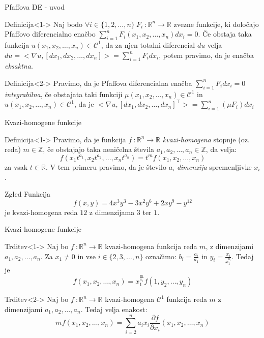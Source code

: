 \documentclass[t, 8pt]{beamer} %
\newcommand{\mth}[1]{\ensuremath{\mathbb{#1}}}
\newcommand{\R}{\mth{R}}
\newcommand{\Z}{\mth{Z}}
\newcommand{\pojem}[1]{\emph{#1}}
\newcommand{\map}[3]{\ensuremath{{#1}~: {#2} \rightarrow {#3}}}
\newcommand{\fillblack}[1]{
	\begin{tikzpicture}[remember picture, overlay]
		\node [shift={(0 cm,0cm)}]  at (current page.south west)
		{%
			\begin{tikzpicture}[remember picture, overlay] at (current page.south west)
				\draw [fill=black] (0, 0) -- (0,#1 \paperheight) --
				(\paperwidth,#1 \paperheight) -- (\paperwidth,0) -- cycle ;
			\end{tikzpicture}
		};
		\draw (current page.north west) rectangle (current page.south east);
	\end{tikzpicture}
}
\begin{document}
	\begin{frame}{Pfaffova DE - uvod}
		
		\begin{block}{Definicija}<1->
			Naj bodo $\forall i\in\{1, 2, \ldots, n\}~ \map{F_i}{\R^n}{\R}$ zvezne funkcije, ki določajo Pfaffovo diferencialno enačbo $\sum_{i = 1}^{n}F_i(x_1, x_2, \ldots, x_n)dx_i = 0$. Če obstaja taka funkcija $u(x_1, x_2, \ldots, x_n)\in \mathcal{C}^1$, da za njen totalni diferencial $du$ velja $du = <\nabla u, [dx_1, dx_2, \ldots, dx_n]> = \sum_{i = 1}^{n}F_i dx_i$, potem pravimo, da je enačba \pojem{eksaktna}.
		\end{block}
		\begin{block}{Definicija}<2->
			Pravimo, da je Pfaffova diferencialna enačba $\sum_{i = 1}^n F_i dx_i = 0$ \pojem{integrabilna}, če obstajata taki funkciji $\mu(x_1, x_2, \ldots, x_n)\in \mathcal{C}^1$ in $u(x_1, x_2, \ldots, x_n)\in \mathcal{C}^1$, da je $<\nabla u,[dx_1, dx_2, \ldots, dx_n]^\top> = \sum_{i = 1}^n (\mu F_i) dx_i$
		\end{block}
		
	\end{frame}
	
	\begin{frame}{Kvazi-homogene funkcije}
		\begin{block}{Definicija}<1->
			Pravimo, da je funkcija $\map{f}{\R^n}{\R}$ \pojem{kvazi-homogena} stopnje (oz. reda) $m\in\Z$, če obstajajo taka neničelna števila $a_1, a_2, \ldots, a_n \in \Z$, da velja: $$f(x_1t^{a_1}, x_2t^{a_2}, \ldots, x_nt^{a_n}) = t^mf(x_1, x_2, \ldots, x_n)$$
			za vsak $t\in\R$.
			V tem primeru pravimo, da je število $a_i$ \pojem{dimenzija} spremenljivke $x_i$.
		\end{block}
		\begin{block}{Zgled}
			Funkcija $$f(x, y) = 4x^3y^3 -3x^2y^6 + 2xy^9 - y^{12}$$ je kvazi-homogena reda $12$ z dimenzijama $3$ ter $1$.
		\end{block}
	\end{frame}
	
	\begin{frame}{Kvazi-homogene funkcije}
		
		\begin{block}{Trditev}<1->
			Naj bo $\map{f}{\R^n}{\R}$ kvazi-homogena funkcija reda $m$, z dimenzijami $a_1, a_2, \ldots, a_n$. Za $x_1 \neq 0$ in vse $i\in \{2, 3, \ldots, n\}$ označimo: $b_i = \frac{a_i}{a_1}$ in $y_i = \frac{x_i}{x_1^{b_i}}$. Tedaj je $$f(x_1, x_2, \ldots, x_n) = x_1^{\frac{m}{a_1}}f(1, y_2, \ldots, y_n)$$
		\end{block}
		
		\begin{block}{Trditev}<2->
			Naj bo $\map{f}{\R^n}{\R}$ kvazi-homogena $\mathcal{C}^1$ funkcija reda $m$ z dimenzijami $a_1, a_2, \ldots, a_n$. Tedaj velja enakost: $$mf(x_1, x_2, \ldots, x_n) = \sum_{i = 2}^{n}a_ix_i\frac{\partial f}{\partial x_i}(x_1, x_2, \ldots, x_n)$$
		\end{block}
		\end{frame}
		
\end{document}

